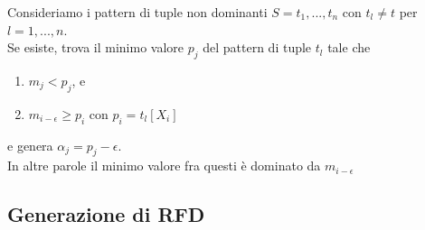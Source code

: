 \begin{itemize}
		Consideriamo i pattern di tuple non dominanti $S=t_{1},...,t_{n}$ con $t_{l}\neq t$ per $l=1,...,n$.\\
		Se esiste, trova il minimo valore $p_{j}$ del pattern di tuple $t_{l}$ tale che
		\begin{enumerate}
			\item  $m_{j}<p_{j}$, e
			\item $m_{i-\epsilon} \geq p_{i}$ con $p_{i}=t_{l}[X_{i}]$
		\end{enumerate}  
	e genera $\alpha_{j}= p_{j} -\epsilon$.\\ In altre parole il minimo valore fra questi è dominato da $m_{i-\epsilon}$
		                                                                                                                                                                       
\end{itemize}

\subsection{Generazione di RFD}